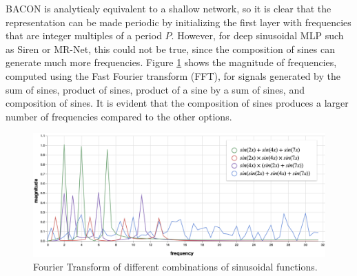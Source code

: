 BACON \citep{bacon2021} is analyticaly equivalent to a shallow network, so it is clear that the representation can be made periodic by initializing the first layer with frequencies that are integer multiples of a period $P$. However, for deep sinusoidal MLP such as Siren \cite{sitzmann2019siren} or MR-Net, this could not be true, since the composition of sines can generate much more frequencies. Figure \ref{f:generated-frequencies} shows the magnitude of frequencies, computed using the Fast Fourier transform (FFT), for signals generated by the sum of sines, product of sines, product of a sine by a sum of sines, and composition of sines. It is evident that the composition of sines produces a larger number of frequencies compared to the other options.



\begin{figure}[h]
\centering
\includegraphics[width=0.80\linewidth]{img/ch6/generated_frequencies.png}
\caption{Fourier Transform of different combinations of sinusoidal functions.}
\label{f:generated-frequencies}
\end{figure}
    
